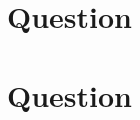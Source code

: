\documentclass[12pt,onecolumn,a4paper]{article}
\newcommand\question{
	\section{Question \numberstringnum{\thesection}}
}
\begin{document}
	
	
	\FloatBarrier
	\question%
	
	
	
	
	
	\FloatBarrier
	\question%
	
	
	
	
	\newpage
	
	
	
\end{document}
